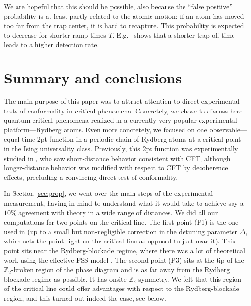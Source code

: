 \documentclass[a4paper,11pt]{article}
\theoremstyle{remark}
\theoremstyle{theorem}
\begin{document}
We are hopeful that this should be possible, also because the ``false positive'' probability is at least partly related to the atomic motion: if an atom has moved too far from the trap center, it is hard to recapture. This probability is expected to decrease for shorter ramp times $T$. E.g.~\cite[Extended Data Fig. 2]{Bernien:2017ubn} shows that a shorter trap-off time leads to a higher detection rate.

\section{Summary and conclusions}\label{sec:concl}

The main purpose of this paper was to attract attention to direct experimental tests of conformality in critical phenomena. Concretely, we chose to discuss here quantum critical phenomena realized in a currently very popular experimental platform---Rydberg atoms. Even more concretely, we focused on one observable---equal-time 2pt function in a periodic chain of Rydberg atoms at a critical point in the Ising universality class. Previously, this 2pt function was experimentally studied in \cite{Fang:2024uyf}, who saw short-distance behavior consistent with CFT, although longer-distance behavior was modified with respect to CFT by decoherence effects, precluding a convincing direct test of conformality.

In Section \ref{sec:prop}, we went over the main steps of the experimental measurement, having in mind to understand what it would take to achieve say a $10\%$ agreement with theory in a wide range of distances. We did all our computations for two points on the critical line. The first point (P1) is the one used in \cite{Fang:2024uyf} (up to a small but non-negligible correction in the detuning parameter $\Delta$, which sets the point right on the critical line as opposed to just near it). This point sits near the Rydberg-blockade regime, where there was a lot of theoretical work using the effective FSS model \cite{Slagle:2021ene,FSS}. The second point (P3) sits at the tip of the $\mathbb{Z}_2$-broken region of the phase diagram and is as far away from the Rydberg blockade regime as possible. It has onsite $\mathbb{Z}_2$ symmetry. We felt that this region of the critical line could offer advantages with respect to the Rydberg-blockade region, and this turned out indeed the case, see below.
\end{document}
